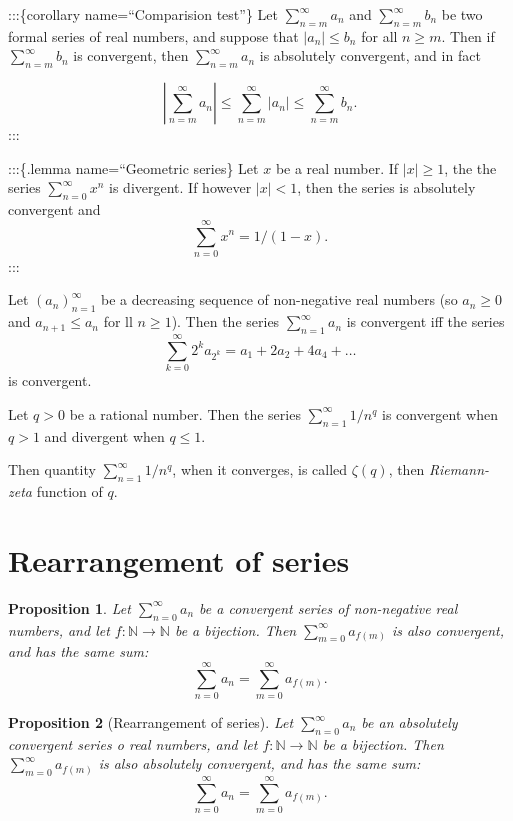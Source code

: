 \documentclass[
]{book}
\newtheorem{proposition}{Proposition}[chapter]
\theoremstyle{definition}
\theoremstyle{definition}
\theoremstyle{definition}
\theoremstyle{definition}
\theoremstyle{remark}
\begin{document}
:::\{corollary name=``Comparision test''\}
Let \(\sum_{n=m}^{\infty}a_n\) and \(\sum_{n=m}^{\infty}b_n\) be two formal series of real numbers, and suppose that \(|a_n|\leq b_n\) for all \(n\geq m\). Then if \(\sum_{n=m}^{\infty}b_n\) is convergent, then \(\sum_{n=m}^{\infty}a_n\) is absolutely convergent, and in fact

\[
\left|\sum_{n=m}^{\infty}a_n\right|\leq \sum_{n=m}^{\infty}|a_n|\leq\sum_{n=m}^{\infty}b_n.
\]
:::

:::\{.lemma name=``Geometric series\}
Let \(x\) be a real number. If \(|x|\geq 1\), the the series \(\sum_{n=0}^{\infty}x^n\) is divergent. If however \(|x|<1\), then the series is absolutely convergent and
\[
\sum_{n=0}^{\infty}x^n = 1/(1-x).
\]
:::

Let \((a_n)_{n=1}^{\infty}\) be a decreasing sequence of non-negative real numbers (so \(a_n\geq 0\) and \(a_{n+1}\leq a_n\) for ll \(n\geq 1\)). Then the series \(\sum_{n=1}^{\infty}a_n\) is convergent iff the series
\[
\sum_{k=0}^{\infty}2^ka_{2^k}=a_1+2a_2+4a_4+\dots
\]
is convergent.

Let \(q>0\) be a rational number. Then the series \(\sum_{n=1}^{\infty}1/n^q\) is convergent when \(q>1\) and divergent when \(q\leq 1\).

Then quantity \(\sum_{n=1}^{\infty}1/n^q\), when it converges, is called \(\zeta(q)\), then \emph{Riemann-zeta} function of \(q\).

\section{Rearrangement of series}\label{rearrangement-of-series}

\begin{proposition}
Let \(\sum_{n=0}^{\infty}a_n\) be a convergent series of non-negative real numbers, and let \(f:\mathbb{N}\to\mathbb{N}\) be a bijection. Then \(\sum_{m=0}^{\infty}a_{f(m)}\) is also convergent, and has the same sum:
\[
\sum_{n=0}^{\infty}a_n=\sum_{m=0}^{\infty}a_{f(m)}.
\]
\end{proposition}

\begin{proposition}[Rearrangement of series]
Let \(\sum_{n=0}^{\infty}a_n\) be an absolutely convergent series o real numbers, and let \(f:\mathbb{N}\to\mathbb{N}\) be a bijection. Then \(\sum_{m=0}^{\infty}a_{f(m)}\) is also absolutely convergent, and has the same sum:
\[
\sum_{n=0}^{\infty}a_n=\sum_{m=0}^{\infty}a_{f(m)}.
\]
\end{proposition}
\end{document}

